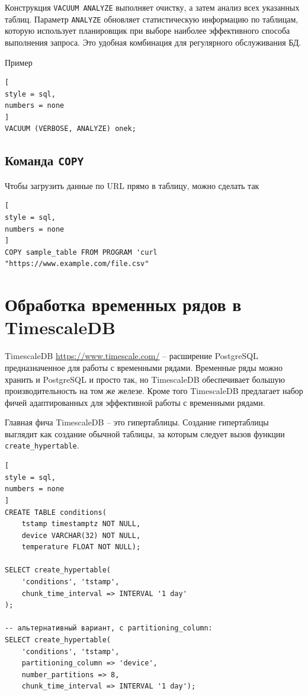 \documentclass[%
	11pt,
	a4paper,
	utf8,
		]{article}
\begin{document}
Конструкция \texttt{VACUUM ANALYZE} выполняет очистку, а затем анализ всех указанных таблиц. Параметр \texttt{ANALYZE} обновляет статистическую информацию по таблицам, которую использует планировщик при выборе наиболее эффективного способа выполнения запроса. Это удобная комбинация для регулярного обслуживания БД.

Пример
\begin{lstlisting}[
style = sql,
numbers = none
]
VACUUM (VERBOSE, ANALYZE) onek;
\end{lstlisting}

\subsection{Команда \texttt{COPY}}

Чтобы загрузить данные по URL прямо в таблицу, можно сделать так
\begin{lstlisting}[
style = sql,
numbers = none
]
COPY sample_table FROM PROGRAM 'curl "https://www.example.com/file.csv"
\end{lstlisting}

\section{Обработка временных рядов в TimescaleDB}

TimescaleDB \url{https://www.timescale.com/} -- расширение PostgreSQL предназначенное для работы с временными рядами. Временные ряды можно хранить и PostgreSQL и просто так, но TimescaleDB обеспечивает большую производительность на том же железе. Кроме того TimescaleDB предлагает набор фичей адаптированных для эффективной работы с временными рядами.

Главная фича TimescaleDB -- это гипертаблицы. Создание гипертаблицы выглядит как создание обычной таблицы, за которым следует вызов функции \verb|create_hypertable|.

\begin{lstlisting}[
style = sql,
numbers = none
]
CREATE TABLE conditions(
	tstamp timestamptz NOT NULL,
	device VARCHAR(32) NOT NULL,
	temperature FLOAT NOT NULL);

SELECT create_hypertable(
	'conditions', 'tstamp',
	chunk_time_interval => INTERVAL '1 day'
);

-- альтернативный вариант, с partitioning_column:
SELECT create_hypertable(
	'conditions', 'tstamp',
	partitioning_column => 'device',
	number_partitions => 8,
	chunk_time_interval => INTERVAL '1 day');
\end{lstlisting}
\end{document}
